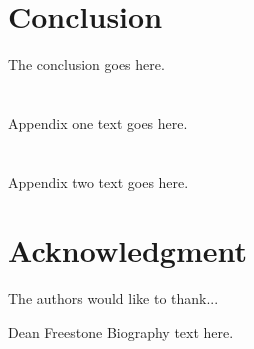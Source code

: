 \documentclass[onecolumn,draftcls]{IEEEtran}
\begin{document}

\section{Conclusion}
The conclusion goes here.

\appendices
\section{}
Appendix one text goes here.

\section{}
Appendix two text goes here.

\section*{Acknowledgment}
The authors would like to thank...

\ifCLASSOPTIONcaptionsoff
  \newpage
\fi








%

\begin{IEEEbiography}{Dean Freestone}
Biography text here.
\end{IEEEbiography}
\end{document}
